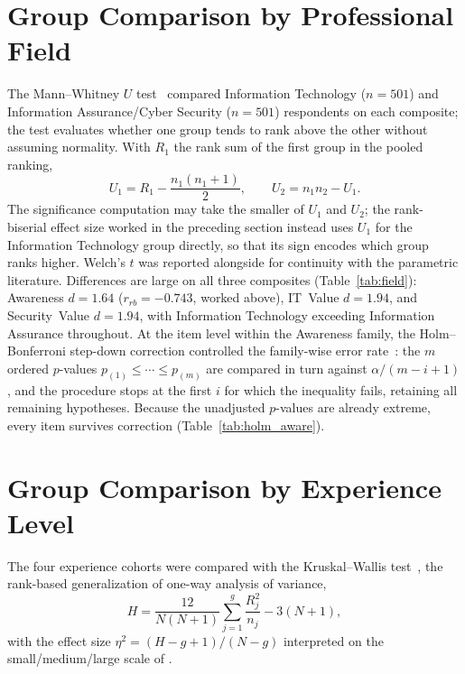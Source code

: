 \section{Group Comparison by Professional Field}

The Mann--Whitney $U$ test~\parencite{Mann_Whitney_1947} compared Information Technology ($n=501$) and Information Assurance/Cyber Security ($n=501$) respondents on each composite; the test evaluates whether one group tends to rank above the other without assuming normality. With $R_1$ the rank sum of the first group in the pooled ranking,
\begin{equation}
  U_1 = R_1 - \frac{n_1(n_1+1)}{2}, \qquad U_2 = n_1 n_2 - U_1 .
\end{equation}
The significance computation may take the smaller of $U_1$ and $U_2$; the rank-biserial effect size worked in the preceding section instead uses $U_1$ for the Information Technology group directly, so that its sign encodes which group ranks higher. Welch's $t$ was reported alongside for continuity with the parametric literature. Differences are large on all three composites (Table~\ref{tab:field}): Awareness $d=1.64$ ($r_{rb}=-0.743$, worked above), IT~Value $d=1.94$, and Security~Value $d=1.94$, with Information Technology exceeding Information Assurance throughout. At the item level within the Awareness family, the Holm--Bonferroni step-down correction controlled the family-wise error rate~\parencite{Holm_1979}: the $m$ ordered $p$-values $p_{(1)}\le\cdots\le p_{(m)}$ are compared in turn against $\alpha/(m-i+1)$, and the procedure stops at the first $i$ for which the inequality fails, retaining all remaining hypotheses. Because the unadjusted $p$-values are already extreme, every item survives correction (Table~\ref{tab:holm_aware}).

\section{Group Comparison by Experience Level}

The four experience cohorts were compared with the Kruskal--Wallis test~\parencite{Kruskal_Wallis_1952}, the rank-based generalization of one-way analysis of variance,
\begin{equation}
  H = \frac{12}{N(N+1)}\sum_{j=1}^{g}\frac{R_j^2}{n_j}-3(N+1),
\end{equation}
with the effect size $\eta^2=(H-g+1)/(N-g)$ interpreted on the small/medium/large scale of \textcite{Cohen_1988}.

